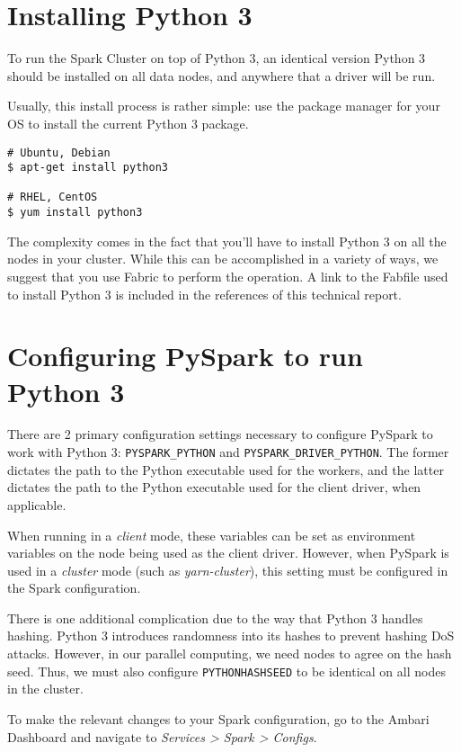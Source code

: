 \documentclass[9pt,twocolumn,twoside]{idsi}
\begin{document}
\section{Installing Python 3}
To run the Spark Cluster on top of Python 3, an identical version Python 3 should be installed on all data nodes, and anywhere that a driver will be run.

Usually, this install process is rather simple: use the package manager for your OS to install the current Python 3 package.

\begin{verbatim}
# Ubuntu, Debian
$ apt-get install python3

# RHEL, CentOS
$ yum install python3
\end{verbatim}

The complexity comes in the fact that you'll have to install Python 3 on all the nodes in your cluster. While this can be accomplished in a variety of ways, we suggest that you use Fabric to perform the operation. A link to the Fabfile used to install Python 3 is included in the references of this technical report.

\section{Configuring PySpark to run Python 3}

There are 2 primary configuration settings necessary to configure PySpark to work with Python 3: \texttt{PYSPARK\_PYTHON} and \texttt{PYSPARK\_DRIVER\_PYTHON}. The former dictates the path to the Python executable used for the workers, and the latter dictates the path to the Python executable used for the client driver, when applicable.

When running in a \emph{client} mode, these variables can be set as environment variables on the node being used as the client driver. However, when PySpark is used in a \emph{cluster} mode (such as \emph{yarn-cluster}), this setting must be configured in the Spark configuration.

There is one additional complication due to the way that Python 3 handles hashing. Python 3 introduces randomness into its hashes to prevent hashing DoS attacks. However, in our parallel computing, we need nodes to agree on the hash seed. Thus, we must also configure \texttt{PYTHONHASHSEED} to be identical on all nodes in the cluster.

To make the relevant changes to your Spark configuration, go to the Ambari Dashboard and navigate to \emph{Services > Spark > Configs}.
\end{document}
